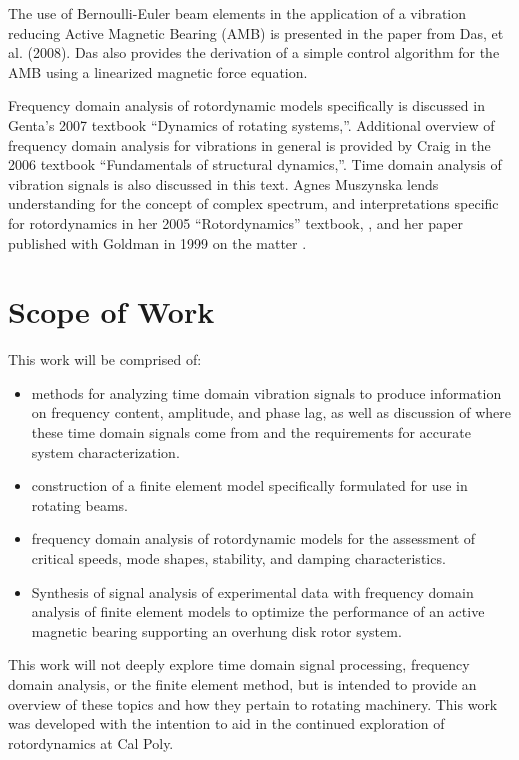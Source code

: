 The use of Bernoulli-Euler beam elements in the application of a vibration reducing Active Magnetic Bearing (AMB) is presented in the paper from Das, et al. (2008\cite{das2008vibration}). Das also provides the derivation of a simple control algorithm for the AMB using a linearized magnetic force equation.\par
Frequency domain analysis of rotordynamic models specifically is discussed in Genta's 2007 textbook ``Dynamics of rotating systems,''\cite{genta2007dynamics}. Additional overview of frequency domain analysis for vibrations in general is provided by Craig in the 2006 textbook ``Fundamentals of structural dynamics,''\cite{craig2006fundamentals}. Time domain analysis of vibration signals is also discussed in this text. Agnes Muszynska lends understanding for the concept of complex spectrum, and interpretations specific for rotordynamics in her 2005 ``Rotordynamics'' textbook, \cite{muszynska2005rotordynamics}, and her paper published with Goldman in 1999 on the matter \cite{goldman1999application}.
\section{Scope of Work}
This work will be comprised of: 
\begin{itemize}
	\item methods for analyzing time domain vibration signals to produce information on frequency content, amplitude, and phase lag, as well as discussion of where these time domain signals come from and the requirements for accurate system characterization.
	\item construction of a finite element model specifically formulated for use in rotating beams.
	\item frequency domain analysis of rotordynamic models for the assessment of critical speeds, mode shapes, stability, and damping characteristics.
	\item Synthesis of signal analysis of experimental data with frequency domain analysis of finite element models to optimize the performance of an active magnetic bearing supporting an overhung disk rotor system.
\end{itemize}
This work will not deeply explore time domain signal processing, frequency domain analysis, or the finite element method, but is intended to provide an overview of these topics and how they pertain to rotating machinery. This work was developed with the intention to aid in the continued exploration of rotordynamics at Cal Poly.\par